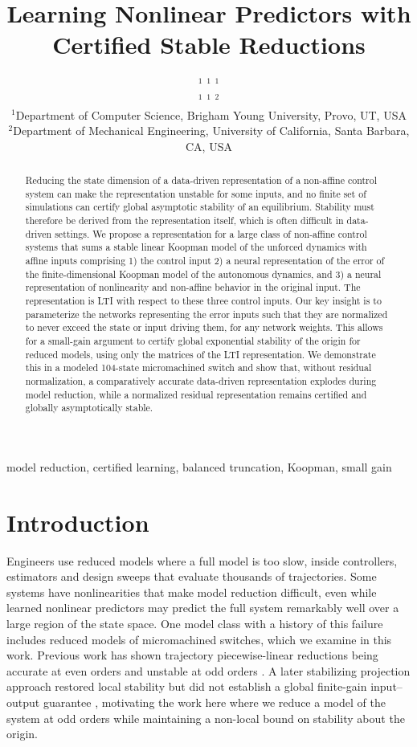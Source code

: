 \documentclass{l4dc2027}
\title[Learning nonlinear predictors with certified stable reductions]{Learning Nonlinear Predictors with Certified Stable Reductions}
\author[Brown et~al.]{%
\Name{Brian Charles Brown}$^1$\quad
\Name{David Grimsman}$^1$\quad
\Name{Michael King}$^1$\\
\Name{Abel Palmer}$^1$\quad
\Name{Sean Warnick}$^1$\quad
\Name{Enoch Yeung}$^2$\\
\addr $^1$Department of Computer Science, Brigham Young University, Provo, UT, USA\\
\addr $^2$Department of Mechanical Engineering, University of California, Santa Barbara, CA, USA
}
\begin{document}
\maketitle
\begin{abstract}
Reducing the state dimension of a data-driven representation of a non-affine control system can make the representation unstable for some inputs, and no finite set of simulations can certify global asymptotic stability of an equilibrium.
Stability must therefore be derived from the representation itself, which is often difficult in data-driven settings.
We propose a representation for a large class of non-affine control systems that sums a stable linear Koopman model of the unforced dynamics with affine inputs comprising 1) the control input 2) a neural representation of the error of the finite-dimensional Koopman model of the autonomous dynamics, and 3) a neural representation of nonlinearity and non-affine behavior in the original input.
The representation is LTI with respect to these three control inputs.
Our key insight is to parameterize the networks representing the error inputs such that they are normalized to never exceed the state or input driving them, for any network weights.
This allows for a small-gain argument to certify global exponential stability of the origin for reduced models, using only the matrices of the LTI representation.
We demonstrate this in a modeled 104-state micromachined switch and show that, without residual normalization, a comparatively accurate data-driven representation explodes during model reduction, while a normalized residual representation remains certified and globally asymptotically stable.
\end{abstract}
\begin{keywords}
model reduction, certified learning, balanced truncation, Koopman, small gain
\end{keywords}

\section{Introduction}
Engineers use reduced models where a full model is too slow, inside controllers, estimators and design sweeps that evaluate thousands of trajectories.
Some systems have nonlinearities that make model reduction difficult, even while learned nonlinear predictors may predict the full system remarkably well over a large region of the state space.
One model class with a history of this failure includes reduced models of micromachined switches, which we examine in this work.
Previous work has shown trajectory piecewise-linear reductions being accurate at even orders and unstable at odd orders \citep{vasilyev-dac}. 
A later stabilizing projection approach restored local stability but did not establish a global finite-gain input--output guarantee \citep{bond-daniel}, motivating the work here where we reduce a model of the system at odd orders while maintaining a non-local bound on stability about the origin. 
\end{document}
